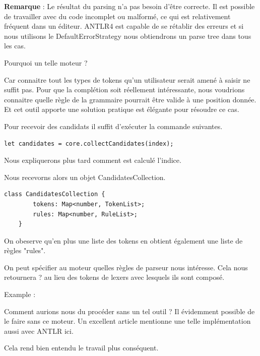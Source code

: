 \documentclass[
    iict, %
    il, %
]{heig-tb}
\begin{document}
\textbf{Remarque} : Le résultat du parsing n'a pas besoin d'être correcte. Il est possible de travailler avec du code incomplet ou malformé, ce qui est relativement fréquent dans un éditeur.
ANTLR4 est capable de se rétablir des erreurs et si nous utilisons le DefaultErrorStrategy nous obtiendrons un parse tree dans tous les cas.

Pourquoi un telle moteur ?

Car connaitre tout les types de tokens qu'un utilisateur serait amené à saisir ne suffit pas. Pour que la complétion soit réellement intéressante, nous voudrions connaitre quelle règle de la grammaire pourrait être valide à une position donnée.
Et cet outil apporte une solution pratique est élégante pour résoudre ce cas. %


Pour recevoir des candidats il suffit d'exécuter la commande suivantes.

\begin{lstlisting}[frame=single]
    let candidates = core.collectCandidates(index);
\end{lstlisting}


Nous expliquerons plus tard comment est calculé l'indice.

Nous recevorns alors un objet CandidatesCollection.

\begin{lstlisting}[frame=single]
    class CandidatesCollection {
        tokens: Map<number, TokenList>;
        rules: Map<number, RuleList>;
    }
\end{lstlisting}


On obeserve qu'en plus une liste des tokens en obtient également une liste de règles "rules".


On peut spécifier au moteur quelles règles de parseur nous intéresse. Cela nous retournera ? au lieu des tokens de lexers avec lesquels ils sont composé.

Example :


Comment aurions nous du procéder sans un tel outil ?
Il évidemment possible de le faire sans ce moteur. Un excellent article mentionne une telle implémentation aussi avec ANTLR ici.

Cela rend bien entendu le travail plus conséquent.
\end{document}

